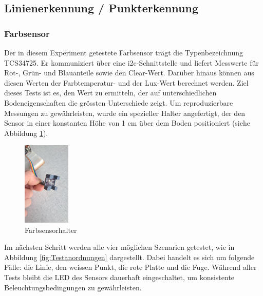 \documentclass[../main.tex]{subfiles}
\begin{document}
\subsection{Linienerkennung / Punkterkennung} \label{sec:Linienerkennung_Punkterkennung_Test}
\subsubsection{Farbsensor}
Der in diesem Experiment getestete Farbsensor trägt die Typenbezeichnung TCS34725. Er kommuniziert über eine \gls{i2c}-Schnittstelle und liefert Messwerte für Rot-, Grün- und Blauanteile sowie den Clear-Wert. Darüber hinaus können aus diesen Werten der Farbtemperatur- und der Lux-Wert berechnet werden. Ziel dieses Tests ist es, den Wert zu ermitteln, der auf unterschiedlichen Bodeneigenschaften die grössten Unterschiede zeigt. Um reproduzierbare Messungen zu gewährleisten, wurde ein spezieller Halter angefertigt, der den Sensor in einer konstanten Höhe von 1 cm über dem Boden positioniert (siehe Abbildung \ref{fig:Farbsensorhalter}).

\begin{figure}[H] %
    \centering
    \includegraphics[width=0.2\textwidth]{img/sensortest/FarbsensorHalter.jpg} %
    \caption{Farbsensorhalter}
    \label{fig:Farbsensorhalter} %
\end{figure}

Im nächsten Schritt werden alle vier möglichen Szenarien getestet, wie in Abbildung \ref{fig:Testanordnungen} dargestellt. Dabei handelt es sich um folgende Fälle: die Linie, den weissen Punkt, die rote Platte und die Fuge. Während aller Tests bleibt die LED des Sensors dauerhaft eingeschaltet, um konsistente Beleuchtungsbedingungen zu gewährleisten.
\end{document}

